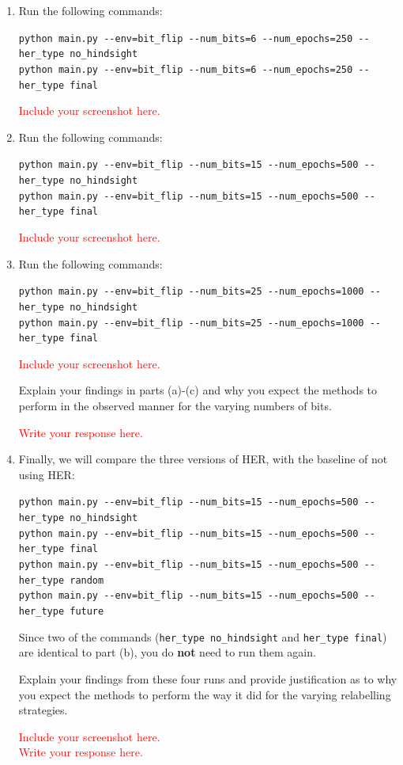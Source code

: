 \documentclass[12pt]{article}
\begin{document}
\begin{enumerate}[label=\alph*)]

\item Run the following commands:

\small
\verb|python main.py --env=bit_flip --num_bits=6 --num_epochs=250 --her_type no_hindsight| \\
\verb|python main.py --env=bit_flip --num_bits=6 --num_epochs=250 --her_type final|

\textcolor{red}{Include your screenshot here.}

\normalsize
\item Run the following commands:

\small
\verb|python main.py --env=bit_flip --num_bits=15 --num_epochs=500 --her_type no_hindsight| \\
\verb|python main.py --env=bit_flip --num_bits=15 --num_epochs=500 --her_type final|

\textcolor{red}{Include your screenshot here.}


\normalsize
\item Run the following commands:

\small
\verb|python main.py --env=bit_flip --num_bits=25 --num_epochs=1000 --her_type no_hindsight| \\
\verb|python main.py --env=bit_flip --num_bits=25 --num_epochs=1000 --her_type final|

\textcolor{red}{Include your screenshot here.}

\normalsize Explain your findings in parts (a)-(c) and why you expect the methods to perform in the observed manner for the varying numbers of bits.

\textcolor{red}{Write your response here.}

\normalsize
\item Finally, we will compare the three versions of HER, with the baseline of not using HER:

\small
\verb|python main.py --env=bit_flip --num_bits=15 --num_epochs=500 --her_type no_hindsight| \\
\verb|python main.py --env=bit_flip --num_bits=15 --num_epochs=500 --her_type final| \\
\verb|python main.py --env=bit_flip --num_bits=15 --num_epochs=500 --her_type random| \\
\verb|python main.py --env=bit_flip --num_bits=15 --num_epochs=500 --her_type future|

\normalsize
Since two of the commands (\verb|her_type no_hindsight| and \verb|her_type final|) are identical to part (b), you do \textbf{not} need to run them again.

\normalsize Explain your findings from these four runs and provide justification as to why you expect the methods to perform the way it did for the varying relabelling strategies.

\textcolor{red}{Include your screenshot here.} \\
\textcolor{red}{Write your response here.}

\end{enumerate}
\end{document}
